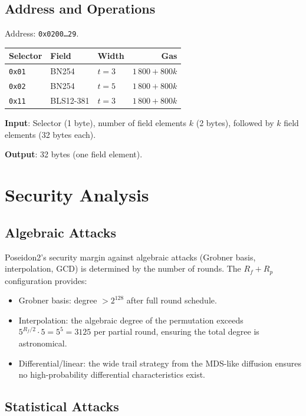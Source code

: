 \documentclass[11pt,a4paper]{article}
\begin{document}
\subsection{Address and Operations}

Address: \texttt{0x0200\ldots29}.

\begin{table}[H]
\centering
\begin{tabular}{lllr}
\toprule
\textbf{Selector} & \textbf{Field} & \textbf{Width} & \textbf{Gas} \\
\midrule
\texttt{0x01} & BN254 & $t = 3$ & $1\,800 + 800k$ \\
\texttt{0x02} & BN254 & $t = 5$ & $1\,800 + 800k$ \\
\texttt{0x11} & BLS12-381 & $t = 3$ & $1\,800 + 800k$ \\
\bottomrule
\end{tabular}
\end{table}

\textbf{Input}: Selector (1 byte), number of field elements $k$ (2 bytes),
followed by $k$ field elements (32 bytes each).

\textbf{Output}: 32 bytes (one field element).

\section{Security Analysis}

\subsection{Algebraic Attacks}

Poseidon2's security margin against algebraic attacks (Grobner basis, interpolation,
GCD) is determined by the number of rounds. The $R_f + R_p$ configuration provides:
\begin{itemize}
  \item Grobner basis: degree $> 2^{128}$ after full round schedule.
  \item Interpolation: the algebraic degree of the permutation exceeds $5^{R_f/2} \cdot 5 = 5^5 = 3125$ per partial round, ensuring the total degree is astronomical.
  \item Differential/linear: the wide trail strategy from the MDS-like diffusion
    ensures no high-probability differential characteristics exist.
\end{itemize}

\subsection{Statistical Attacks}
\end{document}
